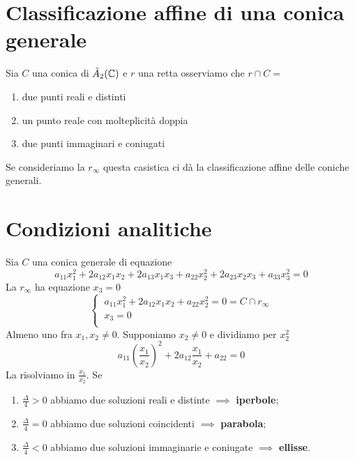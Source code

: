\documentclass{report}
\begin{document}
\section{Classificazione affine di una conica generale}

Sia \(C\) una conica di \(\tilde{A}_{2}(\CC) \) e \(r\) una retta osserviamo che \(r \cap C =\)
\begin{enumerate}
    \item due punti reali e distinti
    \item un punto reale con molteplicità doppia
    \item due punti immaginari e coniugati
\end{enumerate}
Se consideriamo la \(r_{\infty}\) questa casistica ci dà la classificazione affine delle coniche generali.


\section{Condizioni analitiche}
Sia \(C\) una conica generale di equazione \[
a_{11}x_1^2+ 2a_{12}x_1x_2+2a_{13}x_1x_3+a_{22}x_2^2+2a_{23}x_2x_3+a_{33}x_3^2=0
\] 
La \(r_{\infty}\) ha equazione \(x_{3}=0\) \[
\begin{cases}
    \ a_{11}x_1^2+2a_{12}x_1x_2+a_{22}x_2^2= 0 = C \cap r_{\infty} \\
    \ x_3 = 0 \\
\end{cases}
\]
Almeno uno fra \(x_1, x_2 \neq 0\). Supponiamo \(x_2 \neq 0\) e dividiamo per \(x_2^2\) \[
a_{11} \left( \frac{x_1}{x_2} \right) ^2 + 2a_{12} \frac{x_1}{x_2} + a_{22} = 0
\] 
La risolviamo in \(\frac{x_1}{x_2}\). Se 
\begin{enumerate}
    \item \(\frac{\Delta}{4} > 0\) abbiamo due soluzioni reali e distinte \(\implies \) \textbf{iperbole};
    \item \(\frac{\Delta}{4} = 0\) abbiamo due soluzioni coincidenti \(\implies \) \textbf{parabola};
    \item \(\frac{\Delta}{4} < 0\) abbiamo due soluzioni immaginarie e coniugate \(\implies \) \textbf{ellisse}.
\end{enumerate}
\end{document}
